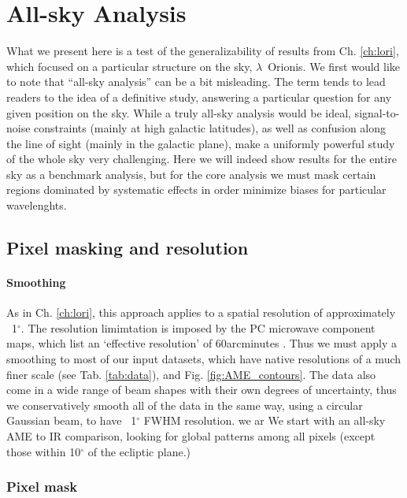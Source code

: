 \chapter{All-sky Analysis}
  \label{sec:analysis}

    What we present here is a test of the generalizability of results from Ch. \ref{ch:lori}, which focused on a particular structure on the sky, $\lambda$~Orionis.
    We first would like to note that ``all-sky analysis'' can be a bit misleading. The term tends to lead readers to the idea of a definitive study, answering a particular question for any given position on the sky.  While a truly all-sky analysis would be ideal, signal-to-noise constraints (mainly at high galactic latitudes), as well as confusion along the line of sight (mainly in the galactic plane), make a uniformly powerful study of the whole sky very challenging. Here we will indeed show results for the entire sky as a benchmark analysis, but for the core analysis we must mask certain regions dominated by systematic effects in order minimize biases for particular wavelenghts.



\section{Pixel masking and resolution}
    \subsubsection{Smoothing}
        As in Ch. \ref{ch:lori}, this approach applies to a spatial resolution of approximately ~1$^{\circ}$. The resolution limimtation is imposed by the PC microwave component maps, which list an `effective resolution' of 60arcminutes \citep{planck15X}. Thus we must apply a smoothing to most of our input datasets, which have native resolutions of a much finer scale (see Tab. \ref{tab:data}), and Fig. \ref{fig:AME_contours}. The data also come in a wide range of beam shapes with their own degrees of uncertainty, thus we conservatively smooth all of the data in the same way, using a circular Gaussian beam, to have ~1$^{\circ}$ FWHM resolution. we ar We start with an all-sky AME to IR comparison, looking for global patterns among all pixels (except those within 10$^{\circ}$ of the ecliptic plane.)

    \subsection{Pixel mask}
